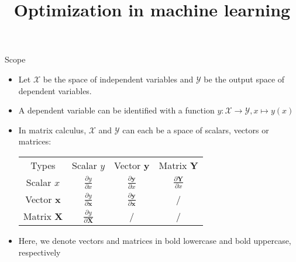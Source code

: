 \documentclass[11pt,compress,t,notes=noshow, xcolor=table]{beamer}
\title{Optimization in machine learning}
\date{}
\begin{document}
\sloppy



\begin{vbframe}{Scope}
\begin{itemize}
    \item Let $\mathcal{X}$ be the space of independent variables and $\mathcal{Y}$ be the output space of dependent variables.
    \item A dependent variable can be identified with a function $y: \mathcal{X} \to \mathcal{Y}, x\mapsto y(x)$ \item In matrix calculus, $\mathcal{X}$ and $\mathcal{Y}$ can each be a space of scalars, vectors or matrices:
    \begin{table}[]
        \centering
        \begin{tabular}{cccc}
             Types& Scalar $y$ &Vector $\mathbf{y}$&Matrix $\mathbf{Y}$ \\
             Scalar $x$& $\frac{\partial y}{\partial x}$ & $\frac{\partial \mathbf{y}}{\partial x}$ & $\frac{\partial \mathbf{Y}}{\partial x}$ \\
             Vector $\mathbf{x}$& $\frac{\partial y}{\partial \mathbf{x}}$ & $\frac{\partial \mathbf{y}}{\partial \mathbf{x}}$ & / \\
             Matrix $\mathbf{X}$& $\frac{\partial y}{\partial \mathbf{X}}$ & / & / 
        \end{tabular}
    \end{table}
    \item Here, we denote vectors and matrices in bold lowercase and bold uppercase, respectively
\end{itemize}
\end{vbframe}
\end{document}
